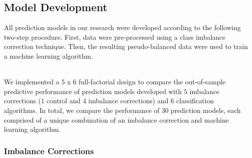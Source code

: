 \documentclass[AMA,STIX1COL,]{WileyNJD-v2}
\begin{document}
\hypertarget{model-development}{%
\subsection{Model Development}\label{model-development}}

All prediction models in our research were developed according to the
following two-step procedure. First, data were pre-processed using a
class imbalance correction technique. Then, the resulting
pseudo-balanced data were used to train a machine learning algorithm.\\
\strut \\
We implemented a \(5\) x \(6\) full-factorial design to compare the
out-of-sample predictive performance of prediction models developed with
\(5\) imbalance corrections (\(1\) control and \(4\) imbalance
corrections) and \(6\) classification algorithms. In total, we compare
the performance of 30 prediction models, each comprised of a unique
combination of an imbalance correction and machine learning algorithm.

\hypertarget{imbalance-corrections}{%
\subsubsection{Imbalance Corrections}\label{imbalance-corrections}}
\end{document}
